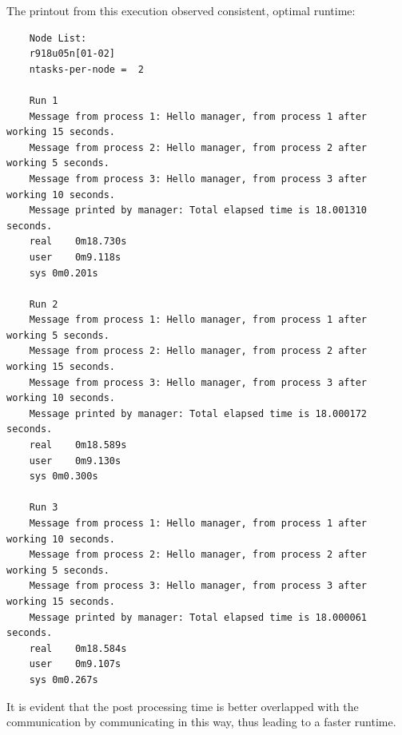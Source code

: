 \documentclass{article}
\begin{document}
The printout from this execution observed consistent, optimal runtime:
\newpage
\begin{verbatim}
    Node List:
    r918u05n[01-02]
    ntasks-per-node =  2
    
    Run 1
    Message from process 1: Hello manager, from process 1 after working 15 seconds.
    Message from process 2: Hello manager, from process 2 after working 5 seconds.
    Message from process 3: Hello manager, from process 3 after working 10 seconds.
    Message printed by manager: Total elapsed time is 18.001310 seconds.
    real	0m18.730s
    user	0m9.118s
    sys	0m0.201s
    
    Run 2
    Message from process 1: Hello manager, from process 1 after working 5 seconds.
    Message from process 2: Hello manager, from process 2 after working 15 seconds.
    Message from process 3: Hello manager, from process 3 after working 10 seconds.
    Message printed by manager: Total elapsed time is 18.000172 seconds.
    real	0m18.589s
    user	0m9.130s
    sys	0m0.300s
    
    Run 3
    Message from process 1: Hello manager, from process 1 after working 10 seconds.
    Message from process 2: Hello manager, from process 2 after working 5 seconds.
    Message from process 3: Hello manager, from process 3 after working 15 seconds.
    Message printed by manager: Total elapsed time is 18.000061 seconds.
    real	0m18.584s
    user	0m9.107s
    sys	0m0.267s
\end{verbatim}
It is evident that the post processing time is better overlapped with the communication by communicating 
in this way, thus leading to a faster runtime.
\end{document}
